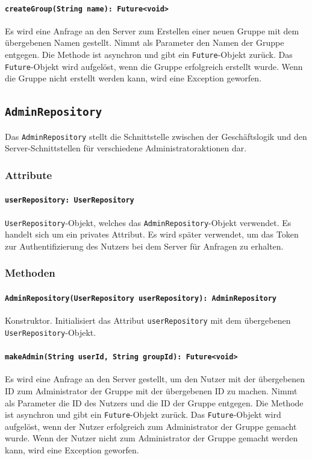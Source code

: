 \documentclass{entwurfsheft}
\begin{document}
\paragraph{\texttt{createGroup(String name): Future<void>}}
Es wird eine Anfrage an den Server zum Erstellen einer neuen Gruppe mit dem übergebenen Namen gestellt. Nimmt als Parameter den Namen der Gruppe entgegen. Die Methode ist asynchron und gibt ein \texttt{Future}-Objekt zurück. Das \texttt{Future}-Objekt wird aufgelöst, wenn die Gruppe erfolgreich erstellt wurde. Wenn die Gruppe nicht erstellt werden kann, wird eine Exception geworfen.

\newpage
\subsection{\texttt{AdminRepository}}\label{sec:AdminRepository}
Das \texttt{AdminRepository} stellt die Schnittstelle zwischen der Geschäftslogik und den Server-Schnittstellen für verschiedene Administratoraktionen dar.
\subsubsection*{Attribute}
\paragraph{\texttt{userRepository: UserRepository}}
\texttt{UserRepository}-Objekt, welches das \texttt{AdminRepository}-Objekt verwendet. Es handelt sich um ein privates Attribut. Es wird später verwendet, um das Token zur Authentifizierung des Nutzers bei dem Server für Anfragen zu erhalten.
\subsubsection*{Methoden}
\paragraph{\texttt{AdminRepository(UserRepository userRepository): AdminRepository}}
Konstruktor. Initialisiert das Attribut \texttt{userRepository} mit dem übergebenen \texttt{UserRepository}-Objekt.
\paragraph{\texttt{makeAdmin(String userId, String groupId): Future<void>}}
Es wird eine Anfrage an den Server gestellt, um den Nutzer mit der übergebenen ID zum Administrator der Gruppe mit der übergebenen ID zu machen. Nimmt als Parameter die ID des Nutzers und die ID der Gruppe entgegen. Die Methode ist asynchron und gibt ein \texttt{Future}-Objekt zurück. Das \texttt{Future}-Objekt wird aufgelöst, wenn der Nutzer erfolgreich zum Administrator der Gruppe gemacht wurde. Wenn der Nutzer nicht zum Administrator der Gruppe gemacht werden kann, wird eine Exception geworfen.
\end{document}
